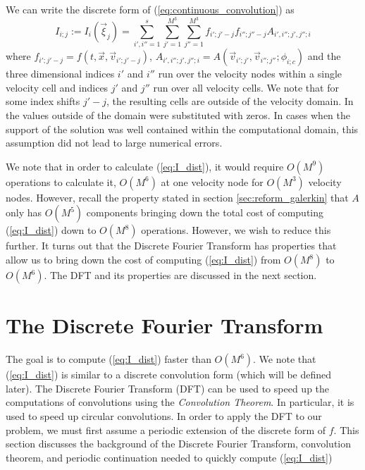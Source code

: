 \documentclass[12pt]{CSUNthesis}
\begin{document}
We can write the discrete form of (\ref{eq:continuous_convolution}) as 
\begin{equation}
\label{eq:I_dist}
I_{i;j}:=I_{i}(\vec{\xi}_{j}) = \sum_{i',i''=1}^s  \sum_{j'=1}^{M^3} \sum_{j''=1}^{M^3} f_{i';j'-j} f_{i'';j''-j} A_{i',i'';j',j'';i} 
\end{equation}
where $f_{i';j'-j}=f(t,\vec{x},\vec{v}_{i';j'-j})$, 
$A_{i',i'';j',j'';i}=A(\vec{v}_{i';j'},\vec{v}_{i'';j''}; \phi_{i;c})$ and the three dimensional 
indices $i'$ and $i''$ run over the velocity nodes within a single velocity cell 
and indices $j'$ and $j''$ run over all velocity cells. We note that for some index 
shifts $j'-j$, the resulting cells are outside of the velocity domain. 
In \cite{AlekseenkoJosyula2012a} the values outside of the domain 
were substituted with zeros. In cases when the support of the solution 
was well contained within the computational domain, this assumption did not lead to 
large numerical errors. 

We note that in order to calculate (\ref{eq:I_dist}), it would require $O(M^9)$ operations to calculate it, $O(M^6)$ at one velocity node for $O(M^3)$ velocity nodes. However, recall the property stated in section \ref{sec:reform_galerkin} that $A$ only has $O(M^5)$ components bringing down the total cost of computing (\ref{eq:I_dist}) down to $O(M^8)$ operations. However, we wish to reduce this further. It turns out that the Discrete Fourier Transform has properties that allow us to bring down the cost of computing (\ref{eq:I_dist}) from $O(M^8)$ to $O(M^6)$. The DFT and its properties are discussed in the next section.


\chapter{The Discrete Fourier Transform}

The goal is to compute (\ref{eq:I_dist}) faster than $O(M^6)$. We note that (\ref{eq:I_dist}) is similar to a discrete convolution form (which will be defined later). The Discrete Fourier Transform (DFT) can be used to speed up the computations of convolutions using the \textit{Convolution Theorem}. In particular, it is used to speed up circular convolutions. In order to apply the DFT to our problem, we must first assume a periodic extension of the discrete form of $f$. This section discusses the background of the Discrete Fourier Transform, convolution theorem, and periodic continuation needed to quickly compute (\ref{eq:I_dist}) 
\end{document}
